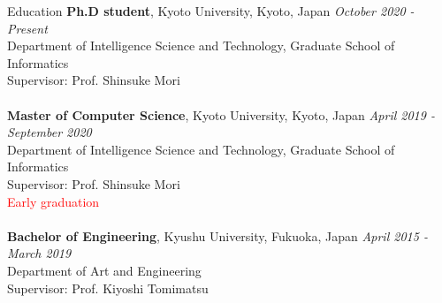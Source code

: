 \begin{rSection}{Education}
{\bf Ph.D student}, Kyoto University, Kyoto, Japan \hfill {\em October 2020 - Present} 
\\ Department of Intelligence Science and Technology, Graduate School of Informatics
\\Supervisor: Prof. Shinsuke Mori\\
\\{\bf Master of Computer Science}, Kyoto University, Kyoto, Japan \hfill {\em April 2019 - September 2020} 
\\ Department of Intelligence Science and Technology, Graduate School of Informatics
\\ Supervisor: Prof. Shinsuke Mori\\
\textcolor{red}{Early graduation}\\
\\{\bf Bachelor of Engineering}, Kyushu University, Fukuoka, Japan \hfill {\em April 2015 - March 2019}
\\ Department of Art and Engineering
\\ Supervisor: Prof. Kiyoshi Tomimatsu
\end{rSection}